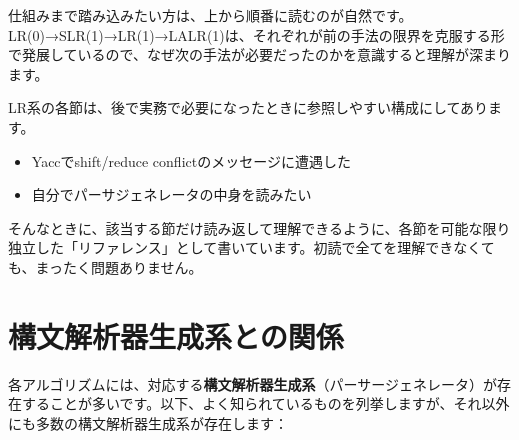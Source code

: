 仕組みまで踏み込みたい方は、上から順番に読むのが自然です。LR(0)→SLR(1)→LR(1)→LALR(1)は、それぞれが前の手法の限界を克服する形で発展しているので、なぜ次の手法が必要だったのかを意識すると理解が深まります。

LR系の各節は、後で実務で必要になったときに参照しやすい構成にしてあります。

\begin{itemize}
\item Yaccでshift/reduce conflictのメッセージに遭遇した
\item 自分でパーサジェネレータの中身を読みたい
\end{itemize}

そんなときに、該当する節だけ読み返して理解できるように、各節を可能な限り独立した「リファレンス」として書いています。初読で全てを理解できなくても、まったく問題ありません。

\hypertarget{chapter5-ux69cbux6587ux89e3ux6790ux5668ux751fux6210ux7cfbux3068ux306eux95a2ux4fc2}{%
\section{構文解析器生成系との関係}\label{chapter5-ux69cbux6587ux89e3ux6790ux5668ux751fux6210ux7cfbux3068ux306eux95a2ux4fc2}}

各アルゴリズムには、対応する\textbf{構文解析器生成系}（パーサージェネレータ）が存在することが多いです。以下、よく知られているものを列挙しますが、それ以外にも多数の構文解析器生成系が存在します：

